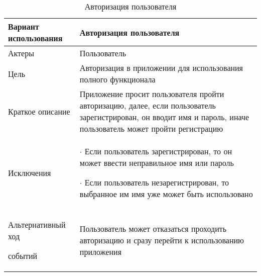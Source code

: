 \documentclass[14pt]{extreport}
\begin{document}
\begin{table}[H]

\begin{center}
\caption{Авторизация пользователя \label{table1}}
\begin{tabular}{|p{5.5cm}|p{10.7cm}|}
\hline
Вариант использования & Авторизация пользователя \\
\hline
Актеры
 & Пользователь
 \\
\hline
Цель
 & Авторизация в приложении для использования полного функционала 
 \\
\hline
Краткое описание
 & Приложение просит пользователя пройти авторизацию, далее, если пользователь зарегистрирован, он вводит имя и пароль, иначе пользователь может пройти регистрацию
 \\
\hline
Исключения
 & 
$\cdot$ Если пользователь зарегистрирован, то он может ввести неправильное имя или пароль

$\cdot$ Если пользователь незарегистрирован, то выбранное им имя уже может быть использовано
 \\
\hline
Альтернативный ход 

событий
& Пользователь может отказаться проходить авторизацию и сразу перейти к использованию приложения \\

\hline
\end{tabular}
\end{center}
\end{table}
\end{document}
